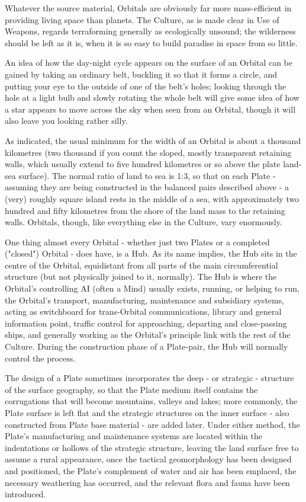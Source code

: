 Whatever the source material, Orbitals are obviously far more mass-efficient in providing living space than planets. The Culture, as is made clear in Use of Weapons, regards terraforming generally as ecologically unsound; the wilderness should be left as it is, when it is so easy to build paradise in space from so little.

An idea of how the day-night cycle appears on the surface of an Orbital can be gained by taking an ordinary belt, buckling it so that it forms a circle, and putting your eye to the outside of one of the belt's holes; looking through the hole at a light bulb and slowly rotating the whole belt will give some idea of how a star appears to move across the sky when seen from an Orbital, though it will also leave you looking rather silly.

As indicated, the usual minimum for the width of an Orbital is about a thousand kilometres (two thousand if you count the sloped, mostly transparent retaining walls, which usually extend to five hundred kilometres or so above the plate land-sea surface). The normal ratio of land to sea is 1:3, so that on each Plate - assuming they are being constructed in the balanced pairs described above - a (very) roughly square island rests in the middle of a sea, with approximately two hundred and fifty kilometres from the shore of the land mass to the retaining walls. Orbitals, though, like everything else in the Culture, vary enormously.

One thing almost every Orbital - whether just two Plates or a completed ("closed") Orbital - does have, is a Hub. As its name implies, the Hub sits in the centre of the Orbital, equidistant from all parts of the main circumferential structure (but not physically joined to it, normally). The Hub is where the Orbital's controlling AI (often a Mind) usually exists, running, or helping to run, the Orbital's transport, manufacturing, maintenance and subsidiary systems, acting as switchboard for trans-Orbital communications, library and general information point, traffic control for approaching, departing and close-passing ships, and generally working as the Orbital's principle link with the rest of the Culture. During the construction phase of a Plate-pair, the Hub will normally control the process.

The design of a Plate sometimes incorporates the deep - or strategic - structure of the surface geography, so that the Plate medium itself contains the corrugations that will become mountains, valleys and lakes; more commonly, the Plate surface is left flat and the strategic structures on the inner surface - also constructed from Plate base material - are added later. Under either method, the Plate's manufacturing and maintenance systems are located within the indentations or hollows of the strategic structure, leaving the land surface free to assume a rural appearance, once the tactical geomorphology has been designed and positioned, the Plate's complement of water and air has been emplaced, the necessary weathering has occurred, and the relevant flora and fauna have been introduced.

